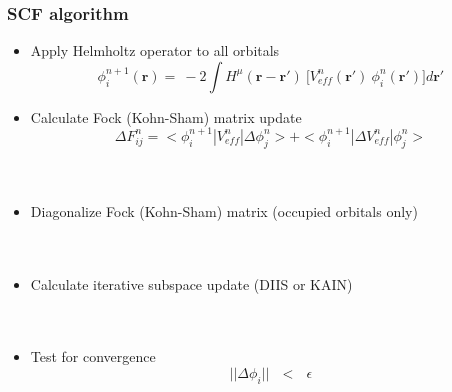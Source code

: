 \documentclass[slides]{beamer}
\begin{document}
\begin{frame}
    \frametitle{SCF algorithm}
    \begin{itemize}
	\item Apply Helmholtz operator to all orbitals
	    \begin{equation}
		\nonumber
		\phi^{n+1}_i(\boldsymbol{r}) =\ -2\int H^{\mu}(\boldsymbol{r}-\boldsymbol{r}')\
		\Big[V^n_{eff}(\boldsymbol{r}')\ \phi^n_i(\boldsymbol{r}')\Big] d\boldsymbol{r}'
	    \end{equation}
	\pause
	\item Calculate Fock (Kohn-Sham) matrix update
	    \begin{equation}
		\nonumber
		\Delta F^n_{ij} = < \phi^{n+1}_i | V^n_{eff} | \Delta \phi^{n}_j >
		+ < \phi^{n+1}_i | \Delta V^n_{eff} | \phi^{n}_j >
	    \end{equation} 
		\ \\
		\ \\
	\pause
	\item Diagonalize Fock (Kohn-Sham) matrix (occupied orbitals only)\\
		\ \\
		\ \\
	\pause
	\item Calculate iterative subspace update (DIIS or KAIN)\\
		\ \\
		\ \\
	\pause
	\item Test for convergence
	    \begin{equation}
		\nonumber
		||\Delta\phi_i||\ \ \ <\ \ \ \epsilon
	    \end{equation}
    \end{itemize}
\end{frame}
\end{document}

